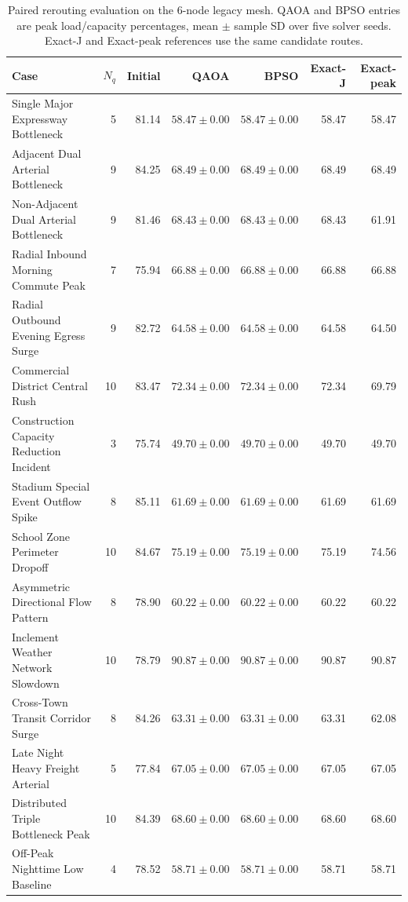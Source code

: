 \begin{table}[ht]
\centering\small
\caption{Paired rerouting evaluation on the 6-node legacy mesh. QAOA and BPSO entries are peak load/capacity percentages, mean $\pm$ sample SD over five solver seeds. Exact-J and Exact-peak references use the same candidate routes.}
\label{tab:yash_legacy_6}
\begin{tabular}{lrrrrrr}
\hline
Case & $N_q$ & Initial & QAOA & BPSO & Exact-J & Exact-peak \\ \hline
Single Major Expressway Bottleneck & 5 & 81.14 & $58.47\pm0.00$ & $58.47\pm0.00$ & 58.47 & 58.47 \\
Adjacent Dual Arterial Bottleneck & 9 & 84.25 & $68.49\pm0.00$ & $68.49\pm0.00$ & 68.49 & 68.49 \\
Non-Adjacent Dual Arterial Bottleneck & 9 & 81.46 & $68.43\pm0.00$ & $68.43\pm0.00$ & 68.43 & 61.91 \\
Radial Inbound Morning Commute Peak & 7 & 75.94 & $66.88\pm0.00$ & $66.88\pm0.00$ & 66.88 & 66.88 \\
Radial Outbound Evening Egress Surge & 9 & 82.72 & $64.58\pm0.00$ & $64.58\pm0.00$ & 64.58 & 64.50 \\
Commercial District Central Rush & 10 & 83.47 & $72.34\pm0.00$ & $72.34\pm0.00$ & 72.34 & 69.79 \\
Construction Capacity Reduction Incident & 3 & 75.74 & $49.70\pm0.00$ & $49.70\pm0.00$ & 49.70 & 49.70 \\
Stadium Special Event Outflow Spike & 8 & 85.11 & $61.69\pm0.00$ & $61.69\pm0.00$ & 61.69 & 61.69 \\
School Zone Perimeter Dropoff & 10 & 84.67 & $75.19\pm0.00$ & $75.19\pm0.00$ & 75.19 & 74.56 \\
Asymmetric Directional Flow Pattern & 8 & 78.90 & $60.22\pm0.00$ & $60.22\pm0.00$ & 60.22 & 60.22 \\
Inclement Weather Network Slowdown & 10 & 78.79 & $90.87\pm0.00$ & $90.87\pm0.00$ & 90.87 & 90.87 \\
Cross-Town Transit Corridor Surge & 8 & 84.26 & $63.31\pm0.00$ & $63.31\pm0.00$ & 63.31 & 62.08 \\
Late Night Heavy Freight Arterial & 5 & 77.84 & $67.05\pm0.00$ & $67.05\pm0.00$ & 67.05 & 67.05 \\
Distributed Triple Bottleneck Peak & 10 & 84.39 & $68.60\pm0.00$ & $68.60\pm0.00$ & 68.60 & 68.60 \\
Off-Peak Nighttime Low Baseline & 4 & 78.52 & $58.71\pm0.00$ & $58.71\pm0.00$ & 58.71 & 58.71 \\
\hline
\end{tabular}
\end{table}

